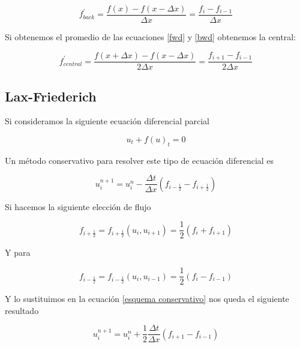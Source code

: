 \documentclass[12pt,a4paper]{book}
\begin{document}
\begin{equation}\label{bwd}
f_{back}^{'}=\frac{f\left(x \right) - f(x - \Delta x) }{\Delta x}=\frac{f_{i}-f_{i-1}}{\Delta x}
\end{equation}

Si obtenemos el promedio de las ecuaciones \ref{fwd} y \ref{bwd} obtenemos la central:

\begin{equation} \label{Centrada}
f_{central}^{'}=\frac{f\left(x + \Delta x\right) - f(x - \Delta x) }{2\Delta x}=\frac{f_{i+1}-f_{i-1}}{2 \Delta x}
\end{equation}



\subsection{Lax-Friederich}

Si consideramos la siguiente ecuación diferencial parcial

\begin{equation} \label{ecu_conser}
u_t+ f\left(u \right)_t=0
\end{equation}

Un método conservativo para resolver este tipo de ecuación diferencial es 

\begin{equation}\label{esquema conservativo}
u_i^{n+1} = u_i^{n} -\frac{\Delta t}{\Delta x} \left(f_{i-\frac{1}{2}} - f_{i+\frac{1}{2}}\right)
\end{equation}



Si hacemos la siguiente elección de flujo 

\begin{equation}
f_{i+\frac{1}{2}} = f_{i+\frac{1}{2}} \left(
u_{i} , u_{i+1}\right) =\frac{1}{2} \left(f_{i} + f_{i+1} \right) 
\end{equation}

Y para 

\begin{equation}
f_{i-\frac{1}{2}} = f_{i-\frac{1}{2}} \left(
u_{i} , u_{i-1}\right) =\frac{1}{2} \left(f_{i} - f_{i-1} \right) 
\end{equation}

Y lo sustituimos en la ecuación \ref{esquema conservativo} nos queda el siguiente resultado

\begin{equation}\label{ec_inestable}
u_i^{n+1} = u_i^{n} + \frac{1}{2}\frac{\Delta t}{\Delta x} \left(f_{i+1} - f_{i-1} \right)
\end{equation}
\end{document}
